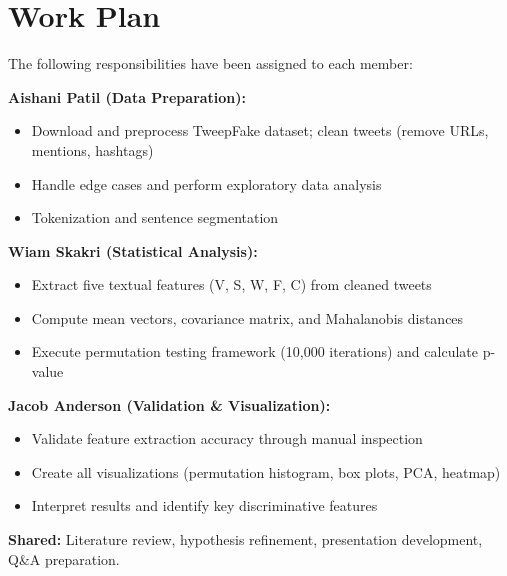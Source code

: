 \section*{Work Plan}

The following responsibilities have been assigned to each member:

\textbf{Aishani Patil (Data Preparation):}
\begin{itemize}
    \item Download and preprocess TweepFake dataset; clean tweets (remove URLs, mentions, hashtags)
    \item Handle edge cases and perform exploratory data analysis
    \item Tokenization and sentence segmentation
\end{itemize}

\textbf{Wiam Skakri (Statistical Analysis):}
\begin{itemize}
    \item Extract five textual features (V, S, W, F, C) from cleaned tweets
    \item Compute mean vectors, covariance matrix, and Mahalanobis distances
    \item Execute permutation testing framework (10,000 iterations) and calculate p-value
\end{itemize}

\textbf{Jacob Anderson (Validation \& Visualization):}
\begin{itemize}
    \item Validate feature extraction accuracy through manual inspection
    \item Create all visualizations (permutation histogram, box plots, PCA, heatmap)
    \item Interpret results and identify key discriminative features
\end{itemize}

\textbf{Shared:} Literature review, hypothesis refinement, presentation development, Q\&A preparation.